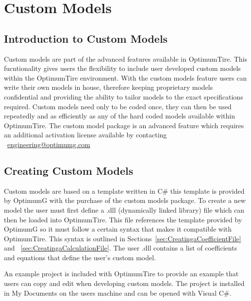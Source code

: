 \chapter{Custom Models}

\setcounter{figure}{0}
\setcounter{table}{0}

\label{sec:CustomModels}

\section{Introduction to Custom Models}
\label{sec:IntroductiontoCustomModels}

Custom models are part of the advanced features available in OptimumTire. This fucntionality gives users the flexibility to include user developed custom models within the OptimumTire environment. With the custom models feature users can write their own models in house, therefore keeping proprietary models confidential and providing the ability to tailor models to the exact specifications required. Custom models need only to be coded once, they can then be used repeatedly and as efficiently as any of the hard coded models available within OptimumTire.
The custom model package is an advanced feature which requires an additional activation license available by contacting ~\href{mailto: engineering@optimumg.com}{engineering@optimumg.com}\\

\section{Creating Custom Models}
\label{sec:CreatingCustomModels}
Custom models are based on a template written in C\# this template is provided by OptimumG with the purchase of the custom models package. To create a new model the user must first define a .dll (dynamically linked library) file which can then be loaded into OptimumTire. This file references the template provided by OptimumG so it must follow a certain syntax that makes it compatible with OptimumTire. This syntax is outlined in Sections~\ref{sec:CreatingaCoefficientFile} and ~\ref{sec:CreatingaCalculationFile}. The user .dll contains a list of coefficients and equations that define the user's custom model.

An example project is included with OptimumTire to provide an example that users can copy and edit when developing custom models. The project is installed in My Documents on the users machine and can be opened with Visual C\#.

